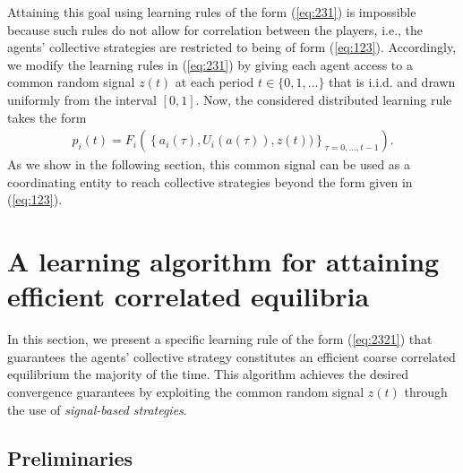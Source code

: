 Attaining this goal using learning rules of the form (\ref{eq:231}) is impossible because such rules do not allow for correlation between the players, i.e., the agents' collective strategies are restricted to being of form (\ref{eq:123}).  Accordingly, we modify the learning rules in (\ref{eq:231}) by giving each agent access to a common random signal $z(t)$ at each period $t \in \{0,1, \dots\}$ that is i.i.d. and drawn uniformly from the interval $[0,1]$.  Now,  the considered distributed learning rule takes the form
%
\begin{eqnarray}\label{eq:2321}
p_i(t) = F_i\left(\left\{a_i(\tau), U_i(a(\tau)), z(t))\right\}_{\tau = 0, \dots, t-1} \right).
\end{eqnarray}
% 
As we show in the following section, this common signal can be used as a coordinating entity to reach collective strategies beyond the form given in (\ref{eq:123}).  


\section{A learning algorithm for attaining efficient correlated equilibria}\label{s:learning algorithm}

In this section, we present a specific learning rule of the form (\ref{eq:2321}) that guarantees the agents' collective strategy constitutes an efficient coarse correlated equilibrium the majority of the time.  This algorithm achieves the desired convergence guarantees by exploiting the common random signal $z(t)$ through the use of {\it signal-based strategies}.  

\subsection{Preliminaries}

